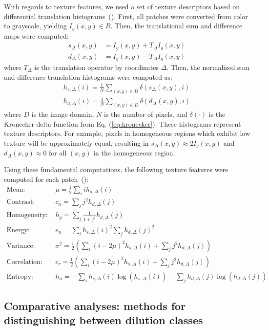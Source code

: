 \documentclass[authoryear]{elsarticle}
\begin{document}
With regards to texture features, we used a set of texture descriptors based on differential translation histograms~(\cite{zhang2012}). First, all patches were converted from color to grayscale, yielding $I_g(x,y) \in R$. Then, the translational sum and difference maps were computed:
\begin{align}
s_\Delta(x,y) &= I_g(x,y) + T_\Delta I_g(x,y) \\
d_\Delta(x,y) &= I_g(x,y) - T_\Delta I_g(x,y)
\end{align}
where $T_\Delta$ is the translation operator by coordinates $\Delta$. Then, the normalized sum and difference translation histograms were computed as:
\begin{align}
h_{s,\Delta}(i) = \frac{1}{N} \sum_{(x,y) \in D} \delta(s_\Delta(x,y),i) \\
h_{d,\Delta}(i) = \frac{1}{N} \sum_{(x,y) \in D} \delta(d_\Delta(x,y),i)
\end{align}
where $D$ is the image domain, $N$ is the number of pixels, and $\delta(\cdot)$ is the Kronecker delta function from Eq. (\ref{eq:kronecker}). These histograms represent texture descriptors. For example, pixels in homogeneous regions which exhibit low texture will be approximately equal, resulting in $s_\Delta(x,y) \approx 2I_g(x,y)$ and $d_\Delta(x,y) \approx 0$ for all $(x,y)$ in the homogeneous region.

Using these fundamental computations, the following texture features were computed for each patch~(\cite{zhang2012,unser1986}):
\begin{align}
\text{Mean: } &\mu = \frac{1}{2}\sum_i i h_{s,\Delta}(i) \label{eq:mean} \\
\text{Contrast: } &c_n = \sum_j j^2 h_{d,\Delta}(j) \\
\text{Homogeneity: } &h_g = \sum_j \frac{1}{1+j^2} h_{d,\Delta}(j) \\
\text{Energy: } &e_n = \sum_i h_{s,\Delta}(i)^2 \sum_j h_{d,\Delta}(j)^2 \\
\text{Variance: } &\sigma^2 = \frac{1}{2} \left( \sum_i (i-2\mu)^2h_{s,\Delta}(i) + \sum_j j^2 h_{d,\Delta}(j) \right) \\
\text{Correlation: } &c_r = \frac{1}{2} \left( \sum_i (i-2\mu)^2 h_{s,\Delta}(i) - \sum_j j^2h_{d,\Delta}(j) \right) \\
\text{Entropy: } &h_n = -\sum_i h_{s,\Delta}(i) \log(h_{s,\Delta}(i)) - \sum_j h_{d,\Delta}(j) \log(h_{d,\Delta}(j)) \label{eq:entropy}
\end{align}\subsection{Comparative analyses: methods for distinguishing between dilution classes}\label{ssec:Theory comparative methods}
\end{document}
